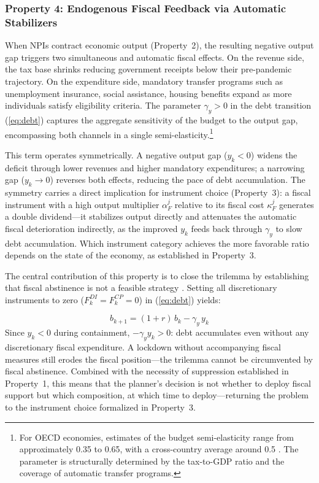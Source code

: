 \documentclass[12pt, a4paper]{article}
\begin{document}
\subsubsection*{Property 4: Endogenous Fiscal Feedback via Automatic Stabilizers}

When NPIs contract economic output (Property~2), the resulting negative output gap triggers two simultaneous and automatic fiscal effects. On the revenue side, the tax base shrinks reducing government receipts below their pre-pandemic trajectory. On the expenditure side, mandatory transfer programs such as unemployment insurance, social assistance, housing benefits expand as more individuals satisfy eligibility criteria. The parameter $\gamma_y > 0$ in the debt transition (\ref{eq:debt}) captures the aggregate sensitivity of the budget to the output gap, encompassing both channels in a single semi-elasticity.\footnote{For OECD economies, estimates of the budget semi-elasticity range from approximately 0.35 to 0.65, with a cross-country average around 0.5 \citep{repec:oecd}. The parameter is structurally determined by the tax-to-GDP ratio and the coverage of automatic transfer programs.}

This term operates symmetrically. A negative output gap ($y_k < 0$) widens the deficit through lower revenues and higher mandatory expenditures; a narrowing gap ($y_k \to 0$) reverses both effects, reducing the pace of debt accumulation. The symmetry carries a direct implication for instrument choice (Property~3): a fiscal instrument with a high output multiplier $\alpha_F^j$ relative to its fiscal cost $\kappa_F^j$ generates a double dividend---it stabilizes output directly and
attenuates the automatic fiscal deterioration indirectly, as the improved $y_k$ feeds back through $\gamma_y$ to slow debt accumulation. Which instrument category achieves the more favorable ratio depends on the state of the economy, as established in Property~3.

The central contribution of this property is to close the trilemma by establishing that fiscal abstinence is not a feasible strategy \citep{Fornaro2020}. Setting all discretionary instruments to zero ($F_k^{DI} = F_k^{CP} = 0$) in (\ref{eq:debt}) yields:

%
\begin{equation}
    b_{k+1} = (1+r) \, b_k - \gamma_y \, y_k
    \label{eq:debt_no_fiscal}
\end{equation}
%
Since $y_k < 0$ during containment, $-\gamma_y y_k > 0$: debt accumulates even without any discretionary fiscal expenditure. A lockdown without accompanying fiscal measures still erodes the fiscal position---the trilemma cannot be circumvented by fiscal abstinence. Combined with the necessity of suppression established in Property~1, this means that the planner's decision is not whether to deploy fiscal support but which composition, at which time to deploy---returning the problem to the instrument choice formalized in Property~3.
\end{document}
